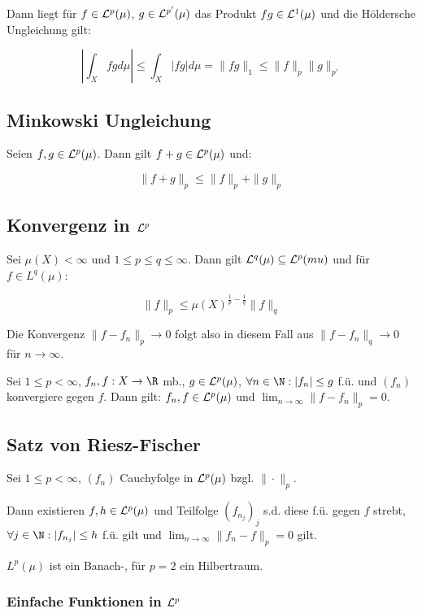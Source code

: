 Dann liegt für $f \in \mathcal{L}^p(\mu)$, $g \in \mathcal{L}^{p'}(\mu)$ das Produkt $fg \in \mathcal{L}^1(\mu)$ und die Höldersche Ungleichung gilt:

\vspace{-4mm}
$$\left| \int_X fg d\mu \right| \leq \int_X |fg| d\mu = \|fg\|_1 \leq \|f\|_p \|g\|_{p'}$$

\subsection*{Minkowski Ungleichung}

Seien $f, g \in \mathcal{L}^p(\mu)$. Dann gilt $f + g \in \mathcal{L}^p(\mu)$ und:

\vspace{-2mm}
$$\| f + g \|_p \leq \|f\|_p + \|g\|_p$$

\subsection*{Konvergenz in $\mathcal{L}^p$}

Sei $\mu(X) < \infty$ und $1 \leq p \leq q \leq \infty$. Dann gilt $\mathcal{L}^q(\mu) \subseteq \mathcal{L}^p(mu)$ und für $f \in L^q(\mu)$:

\vspace{-2mm}
$$\|f\|_p \leq \mu(X)^{\frac{1}{p} - \frac{1}{q}} \|f\|_q$$

Die Konvergenz $\| f - f_n \|_p \to 0$ folgt also in diesem Fall aus $\| f - f_n \|_q \to 0$ für $n \to \infty$.

\spacing

Sei $1 \leq p < \infty$, $f_n, f : X \to \R$ mb., $g \in \mathcal{L}^p(\mu)$, $\forall n \in \N : |f_n| \leq g$ f.ü. und $(f_n)$ konvergiere gegen $f$. Dann gilt: $f_n, f \in \mathcal{L}^p(\mu)$ und $\lim_{n \to \infty} \|f - f_n\|_p = 0$.

\subsection*{Satz von Riesz-Fischer}

Sei $1 \leq p < \infty$, $(f_n)$ Cauchyfolge in $\mathcal{L}^p(\mu)$ bzgl. $\|\cdot\|_p$.

Dann existieren $f, h \in \mathcal{L}^p(\mu)$ und Teilfolge $(f_{n_j})_j$ s.d. diese f.ü. gegen $f$ strebt, $\forall j \in \N : |f_{n_j}| \leq h$ f.ü. gilt und $\displaystyle\lim_{n \to \infty} \|f_n - f\|_p = 0$ gilt.

$L^p(\mu)$ ist ein Banach-, für $p=2$ ein Hilbertraum.

\subsubsection*{Einfache Funktionen in $\mathcal{L}^p$}

